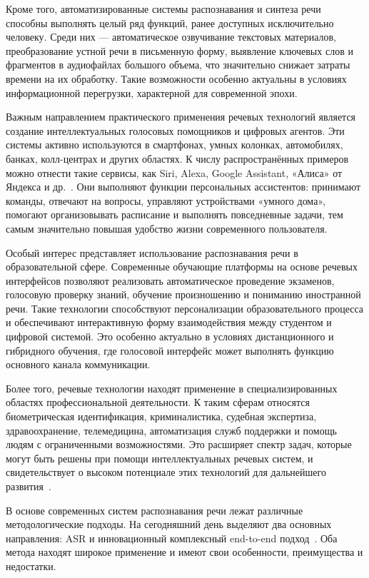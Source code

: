 Кроме того, автоматизированные системы распознавания и синтеза речи способны выполнять целый ряд функций, ранее доступных исключительно человеку. Среди них — автоматическое озвучивание текстовых материалов, преобразование устной речи в письменную форму, выявление ключевых слов и фрагментов в аудиофайлах большого объема, что значительно снижает затраты времени на их обработку. Такие возможности особенно актуальны в условиях информационной перегрузки, характерной для современной эпохи.

Важным направлением практического применения речевых технологий является создание интеллектуальных голосовых помощников и цифровых агентов. Эти системы активно используются в смартфонах, умных колонках, автомобилях, банках, колл-центрах и других областях. К числу распространённых примеров можно отнести такие сервисы, как Siri, Alexa, Google Assistant, «Алиса» от Яндекса и др.~\cite{Hein}. Они выполняют функции персональных ассистентов: принимают команды, отвечают на вопросы, управляют устройствами «умного дома», помогают организовывать расписание и выполнять повседневные задачи, тем самым значительно повышая удобство жизни современного пользователя.

Особый интерес представляет использование распознавания речи в образовательной сфере. Современные обучающие платформы на основе речевых интерфейсов позволяют реализовать автоматическое проведение экзаменов, голосовую проверку знаний, обучение произношению и пониманию иностранной речи. Такие технологии способствуют персонализации образовательного процесса и обеспечивают интерактивную форму взаимодействия между студентом и цифровой системой. Это особенно актуально в условиях дистанционного и гибридного обучения, где голосовой интерфейс может выполнять функцию основного канала коммуникации.

Более того, речевые технологии находят применение в специализированных областях профессиональной деятельности. К таким сферам относятся биометрическая идентификация, криминалистика, судебная экспертиза, здравоохранение, телемедицина, автоматизация служб поддержки и помощь людям с ограниченными возможностями. Это расширяет спектр задач, которые могут быть решены при помощи интеллектуальных речевых систем, и свидетельствует о высоком потенциале этих технологий для дальнейшего развития~\cite{Muravyov}.

В основе современных систем распознавания речи лежат различные методологические подходы. На сегодняшний день выделяют два основных направления: ASR и инновационный комплексный end-to-end подход~\cite{Riqiang}. Оба метода находят широкое применение и имеют свои особенности, преимущества и недостатки.

